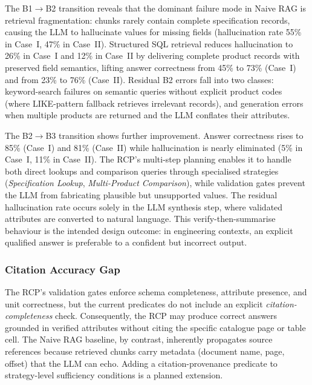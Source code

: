 \documentclass[largeformat]{interact}
\begin{document}
The B1$\rightarrow$B2 transition reveals that the dominant failure mode in Naive RAG is retrieval fragmentation: chunks rarely contain complete specification records, causing the LLM to hallucinate values for missing fields (hallucination rate 55\% in Case~I, 47\% in Case~II). Structured SQL retrieval reduces hallucination to 26\% in Case~I and 12\% in Case~II by delivering complete product records with preserved field semantics, lifting answer correctness from 45\% to 73\% (Case~I) and from 23\% to 76\% (Case~II). Residual B2 errors fall into two classes: keyword-search failures on semantic queries without explicit product codes (where LIKE-pattern fallback retrieves irrelevant records), and generation errors when multiple products are returned and the LLM conflates their attributes.

The B2$\rightarrow$B3 transition shows further improvement. Answer correctness rises to 85\% (Case~I) and 81\% (Case~II) while hallucination is nearly eliminated (5\% in Case~I, 11\% in Case~II). The RCP's multi-step planning enables it to handle both direct lookups and comparison queries through specialised strategies (\emph{Specification Lookup}, \emph{Multi-Product Comparison}), while validation gates prevent the LLM from fabricating plausible but unsupported values. The residual hallucination rate occurs solely in the LLM synthesis step, where validated attributes are converted to natural language. This verify-then-summarise behaviour is the intended design outcome: in engineering contexts, an explicit qualified answer is preferable to a confident but incorrect output.

\subsubsection{Citation Accuracy Gap}
\label{subsubsection:citation_accuracy_gap}
The RCP's validation gates enforce schema completeness, attribute presence, and unit correctness, but the current predicates do not include an explicit \emph{citation-completeness} check. Consequently, the RCP may produce correct answers grounded in verified attributes without citing the specific catalogue page or table cell. The Naive RAG baseline, by contrast, inherently propagates source references because retrieved chunks carry metadata (document name, page, offset) that the LLM can echo. Adding a citation-provenance predicate to strategy-level sufficiency conditions is a planned extension.
\end{document}
